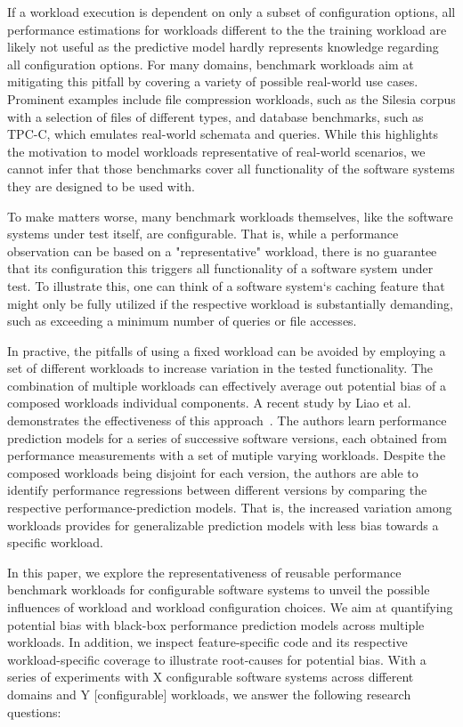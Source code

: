 \documentclass[conference]{IEEEtran}
\begin{document}
If a workload execution is dependent on only a subset of configuration options, all performance estimations for workloads different to the the training workload are likely not useful as the predictive model hardly represents knowledge regarding all configuration options. For many domains, benchmark workloads aim at mitigating this pitfall by covering a variety of possible real-world use cases. Prominent examples include file compression workloads, such as the Silesia corpus with a selection of files of different types, and database benchmarks, such as TPC-C, which emulates real-world schemata and queries. While this highlights the motivation to model workloads representative of real-world scenarios, we cannot infer that those benchmarks cover all functionality of the software systems they are designed to be used with. 

To make matters worse, many benchmark workloads themselves, like the software systems under test itself, are configurable. That is, while a performance observation can be based on a "representative" workload, there is no guarantee that its configuration this triggers all functionality of a software system under test. To illustrate this, one can think of a software system‘s caching feature that might only be fully utilized if the respective workload is substantially demanding, such as exceeding a minimum number of queries or file accesses. 

In practive, the pitfalls of using a fixed workload can be avoided by employing a set of different workloads to increase variation in the tested functionality. The combination of multiple workloads can effectively average out potential bias of a composed workloads individual components. A recent study by Liao et al. demonstrates the effectiveness of this approach~\cite{liao_2020_using_emse}. The authors learn performance prediction models for a series of successive software versions, each obtained from performance measurements with a set of mutiple varying workloads. Despite the composed workloads being disjoint for each version, the authors are able to identify performance regressions between different versions by comparing the respective performance-prediction models. That is, the increased variation among workloads provides for generalizable prediction models with less bias towards a specific workload.

In this paper, we explore the representativeness of reusable performance benchmark workloads for configurable software systems to unveil the possible influences of workload and workload configuration choices. We aim at quantifying potential bias with black-box performance prediction models across multiple workloads. In addition, we inspect feature-specific code and its respective workload-specific coverage to illustrate root-causes for potential bias. 
With a series of experiments with {\color{red}X} configurable software systems across different domains and {\color{red}Y} [configurable] workloads, we answer the following research questions:
\end{document}
